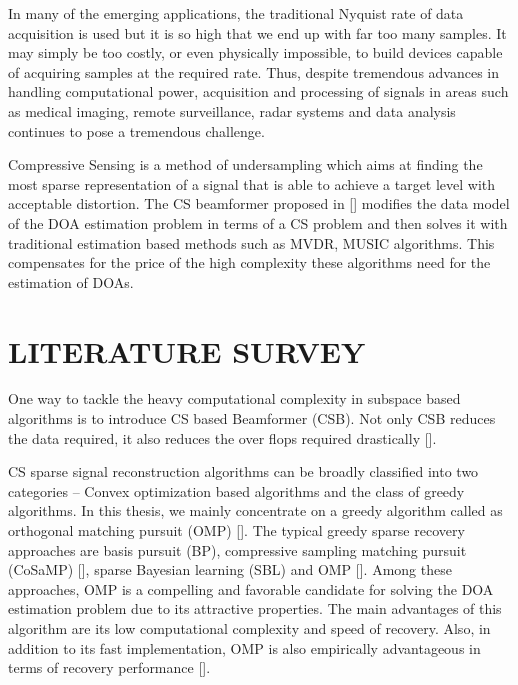 \documentclass[12pt,a4paper]{article}
\theoremstyle{plain}
\theoremstyle{definition}
\begin{document}
In many of the emerging applications, the traditional Nyquist rate of data acquisition is used but it is so high that we end up with far too many samples. It may simply be too costly, or even physically impossible, to build devices capable of acquiring samples at the required rate. Thus, despite tremendous advances in handling computational power, acquisition and processing of signals in areas such as medical imaging, remote surveillance, radar systems and data analysis continues to pose a tremendous challenge.

Compressive Sensing is a method of undersampling which aims at finding the most sparse representation of a signal that is able to achieve a target level with acceptable distortion. The CS beamformer proposed in [\citet{R14}] modifies the data model of the DOA estimation problem in terms of a CS problem and then solves it with traditional estimation based methods such as MVDR, MUSIC algorithms. This compensates for the price of the high complexity these algorithms need for the estimation of DOAs.

\section{LITERATURE SURVEY}
One way to tackle the heavy computational complexity in subspace based algorithms is to introduce CS based Beamformer (CSB). Not only CSB reduces the data required, it also reduces the over flops required drastically [\citet{R14}]. 

CS sparse signal reconstruction algorithms can be broadly classified into two categories – Convex optimization based algorithms and the class of greedy algorithms. In this thesis, we mainly concentrate on a greedy algorithm called as orthogonal matching pursuit (OMP) [\citet{R15}]. The typical greedy sparse recovery approaches are basis pursuit (BP), compressive sampling matching pursuit (CoSaMP) [\citet{R16}], sparse Bayesian learning (SBL) and OMP [\citet{R17}]. Among these approaches, OMP is a compelling and favorable candidate for solving the DOA estimation problem due to its attractive properties. The main advantages of this algorithm are its low computational complexity and speed of recovery. Also, in addition to its fast implementation, OMP is also empirically advantageous in terms of recovery performance [\citet{R18}].
\end{document}
